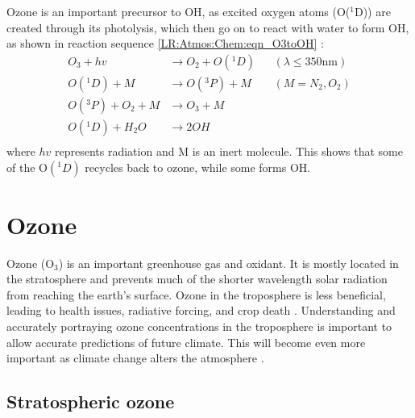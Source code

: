     Ozone is an important precursor to OH, as excited oxygen atoms (O(${}^1$D)) 
    are created through its photolysis, which then go on to react with water to 
    form OH, as shown in reaction sequence \ref{LR:Atmos:Chem:eqn_O3toOH} 
    \parencite{Atkinson2000, AtkinsonArey2003}:
    \begin{equation}
      \begin{aligned}
        O_3+hv            & \to  O_2 + O({}^1D)   && (\lambda \le 350 \text{nm}) \\%
        O({}^1D)+M        & \to  O({}^3P) + M     && (M=N_2, O_2)               \\%
        O({}^3P)+O_2 + M  & \to  O_3 + M          &&                           \\%
        O({}^1D)+H_2O     & \to  2OH              &&                            \\%
      \end{aligned}
      \label{LR:Atmos:Chem:eqn_O3toOH}
    \end{equation}
    where $hv$ represents radiation and M is an inert molecule.
    This shows that some of the O$({}^1D)$ recycles back to ozone, while some 
    forms OH.
      
\section{Ozone}
\label{LR:O3}
  
  Ozone (O$_3$) is an important greenhouse gas and oxidant.
  It is mostly located in the stratosphere and prevents much of the shorter wavelength solar radiation from reaching the earth's surface.
  Ozone in the troposphere is less beneficial, leading to health issues, 
  radiative forcing, and crop death \parencite{Stevenson2013}.
  Understanding and accurately portraying ozone concentrations in the troposphere is important to allow accurate predictions of future climate.
  This will become even more important as climate change alters the atmosphere 
  \parencite{Hegglin2009}.
  
  \subsection{Stratospheric ozone}
  
